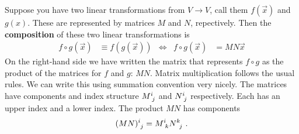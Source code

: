 \documentclass[12pt]{article}
\begin{document}
Suppose you have two linear transformations from $V\to V$, call them $f(\vec{x})$ and $g(x)$. These are represented by matrices $M$ and $N$, repectively. Then the \textbf{composition} of these two linear transformations is
\begin{align}
    f\circ g(\vec{x}) &\equiv f\left(g(\vec{x})\right)
    &
    \Leftrightarrow
    &
    f\circ g(\vec{x})&=
    MN\vec{x}
\end{align}
On the right-hand side we have written the matrix that represents $f\circ g$ as the product of the matrices for $f$ and $g$: $MN$. Matrix multiplication follows the usual rules. We can write this using summation convention very nicely. The matrices have components and index structure $M\aij{i}{j}$ and $N\aij{i}{j}$ respectively. Each has an upper index and a lower index. The product $MN$ has components
\begin{align}
    (MN)\aij{i}{j} = M\aij{i}{k}N\aij{k}{j} \ .
    \label{eq:matrix:multiplication}
\end{align}
\end{document}
